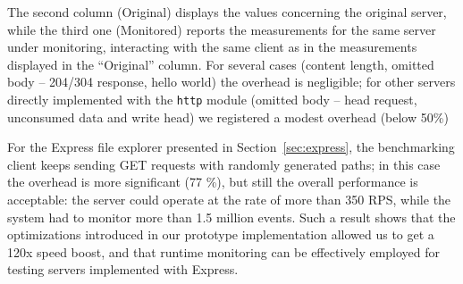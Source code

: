 The second column (Original) displays the values concerning the original server, while the third one
(Monitored) reports the measurements for the same server under monitoring, interacting with the same client as in the measurements displayed in the ``Original'' column.
For several cases (content length, omitted body -- 204/304 response, hello world) the overhead is negligible;
for other servers directly implemented with the \lstinline{http} module (omitted body -- head request, unconsumed data and write head)
we registered a modest overhead (below 50\%)

For the Express file explorer presented in Section~\ref{sec:express}, the benchmarking client keeps sending GET requests
with randomly generated paths; in this case the overhead is more significant (77 \%), but still the overall performance 
is acceptable: the server could operate at the rate of more than 350 RPS, while the system had to monitor more than 1.5 million events.
Such a result shows that the optimizations introduced in our prototype implementation allowed us
to get a 120x speed boost, and that runtime monitoring can be effectively employed for testing servers implemented with Express.
